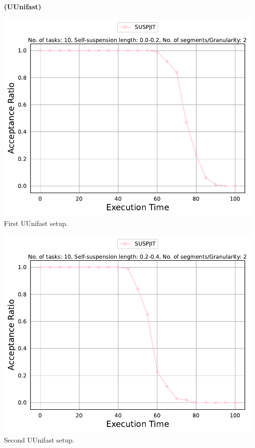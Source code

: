 \documentclass[]{article}
\begin{document}
	\begin{minipage}[t]{0.48\linewidth}
		\centering
		\textbf{(UUnifast)}
		\vspace{0.3cm}
		
		\includegraphics[width=\linewidth]{SUSPJIT[2][0.0-0.2][10].pdf}
		First UUnifast setup.
		\vspace{0.3cm}
		
		\includegraphics[width=\linewidth]{SUSPJIT[2][0.2-0.4][10].pdf}
		Second UUnifast setup.
		\vspace{0.3cm}
		

\end{minipage}
\end{document}
